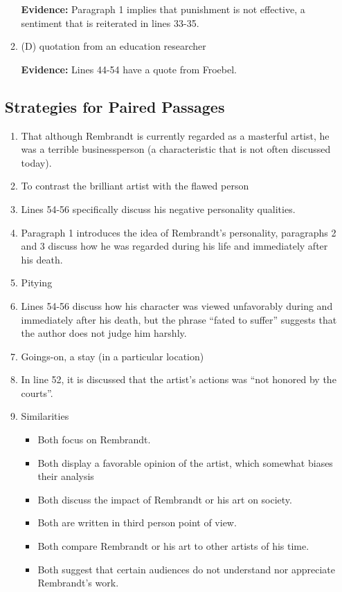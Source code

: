 \begin{enumerate}
\begin{enumerate}
\textbf{Evidence:} Paragraph 1 implies that punishment is not effective, a sentiment that is reiterated in lines 33-35. 

\bigskip
\item (D) quotation from an education researcher

\textbf{Evidence:} Lines 44-54 have a quote from Froebel. 
\end{enumerate}

\subsection{Strategies for Paired Passages}

\begin{enumerate}
\item That although Rembrandt is currently regarded as a masterful artist, he was a terrible businessperson (a characteristic that is not often discussed today).
\item To contrast the brilliant artist with the flawed person
\item Lines 54-56 specifically discuss his negative personality qualities.
\item Paragraph 1 introduces the idea of Rembrandt's personality, paragraphs 2 and 3 discuss how he was regarded during his life and immediately after his death. 
\item Pitying
\item Lines 54-56 discuss how his character was viewed unfavorably during and immediately after his death, but the phrase ``fated to suffer'' suggests that the author does not judge him harshly.
\item Goings-on, a stay (in a particular location)
\item In line 52, it is discussed that the artist's actions was ``not honored by the courts''.

\item Similarities

\begin{itemize}
\item Both focus on Rembrandt.
\item Both display a favorable opinion of the artist, which somewhat biases their analysis 
\item Both discuss the impact of Rembrandt or his art on society.
\item Both are written in third person point of view.
\item Both compare Rembrandt or his art to other artists of his time.
\item Both suggest that certain audiences do not understand nor appreciate Rembrandt's work. 
\end{itemize}


\end{enumerate}
\end{enumerate}
